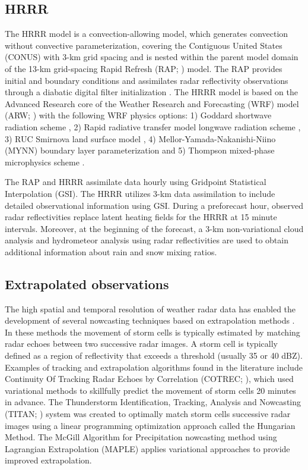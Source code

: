 \documentclass[12pt]{article}
\begin{document}
\subsection{HRRR}
The HRRR model is a convection-allowing model, which generates convection without convective parameterization, covering the Contiguous United States (CONUS) with 3-km grid spacing and is nested within the parent model domain of the 13-km grid-spacing Rapid Refresh (RAP; \citealt{brown++11, wey++11}) model. The RAP provides initial and boundary conditions and assimilates radar reflectivity observations through a diabatic digital filter initialization \citep{huang+93}. The HRRR model is based on the Advanced Research core of the Weather Research and Forecasting (WRF) model (ARW; \citealt{skam++08}) with the following WRF physics options: 
1) Goddard shortwave radiation scheme \citep{chou94}, 
2) Rapid radiative transfer model longwave radiation scheme \citep{mlawer++97}, 
3) RUC Smirnova land surface model \citep{smirnova++97}, 
4) Mellor-Yamada-Nakanishi-Niino (MYNN) boundary layer parameterization \citep{nakanishi04} 
and 5) Thompson mixed-phase microphysics scheme \citep{thompson++08}.

The RAP and HRRR assimilate data hourly using Gridpoint Statistical Interpolation (GSI). The HRRR utilizes 3-km data assimilation to include detailed observational information using GSI. During a preforecast hour, observed radar reflectivities replace latent heating fields for the HRRR at 15 minute intervals. Moreover, at the beginning of the forecast, a 3-km non-variational cloud analysis and hydrometeor analysis using radar reflectivities are used to obtain additional information about rain and snow mixing ratios. 

\subsection{Extrapolated observations }

The high spatial and temporal resolution of weather radar data has enabled the development of several nowcasting techniques based on extrapolation methods \citep{manda++12}. In these methods the movement of storm cells is typically estimated by matching radar echoes between two successive radar images. A storm cell is typically defined as a region of reflectivity that exceeds a threshold (usually 35 or 40 dBZ). Examples of tracking and extrapolation algorithms found in the literature include Continuity Of Tracking Radar Echoes by Correlation (COTREC; \citealt{li95}), which used variational methods \citep{sasaki58, sasaki70} to skillfully predict the movement of storm cells 20 minutes in advance. The Thunderstorm Identification, Tracking, Analysis and Nowcasting (TITAN; \citealt{dixon93}) system was created to optimally match storm cells successive radar images using a linear programming optimization approach called the Hungarian Method. The McGill Algorithm for Precipitation nowcasting method using Lagrangian Extrapolation (MAPLE) \citep{germann02, germann04} applies variational approaches to provide improved extrapolation. 
\end{document}
